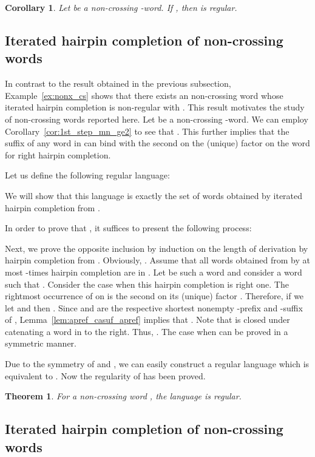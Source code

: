 \documentclass{article}
\theoremstyle{plain}
\newtheorem{theorem}{Theorem}
\newtheorem{corollary}{Corollary}
\theoremstyle{remark}
\begin{document}
\begin{corollary}\label{cor:mn_palindrome-like_regular}
	Let  be a non-crossing -word. 
	If , then  is regular. 
\end{corollary}

\subsection{Iterated hairpin completion of  non-crossing words}

In contrast to the result obtained in the previous subsection, Example~\ref{ex:nonx_cs} shows that there exists an  non-crossing word whose iterated hairpin completion is non-regular with . 
This result motivates the study of  non-crossing words reported here. 
Let  be a non-crossing -word. 
We can employ Corollary~\ref{cor:1st_step_mn_ge2} to see that . 
This further implies that the suffix  of any word in  can bind with the second  on the (unique) factor  on the word for right hairpin completion. 

Let us define the following regular language: 

We will show that this language is exactly the set of words obtained by iterated hairpin completion from . 

In order to prove that , it suffices to present the following process: 


Next, we prove the opposite inclusion by induction on the length of derivation by hairpin completion from . 
Obviously, . 
Assume that all words obtained from  by at most -times hairpin completion are in . 
Let  be such a word and consider a word  such that . 
Consider the case when this hairpin completion is right one. 
The rightmost occurrence of  on  is the second  on its (unique) factor . 
Therefore, if we let  and then . 
Since  and  are the respective shortest nonempty -prefix and -suffix of , Lemma~\ref{lem:apref_casuf_apref} implies that . 
Note that  is closed under catenating a word in  to the right. 
Thus, . 
The case when  can be proved in a symmetric manner. 

Due to the symmetry of  and , we can easily construct a regular language  which is equivalent to . 
Now the regularity of  has been proved. 


\begin{theorem}\label{thm:22nonx_regular}
	For a  non-crossing word , the language  is regular. 
\end{theorem}


\subsection{Iterated hairpin completion of  non-crossing words}
\end{document}

